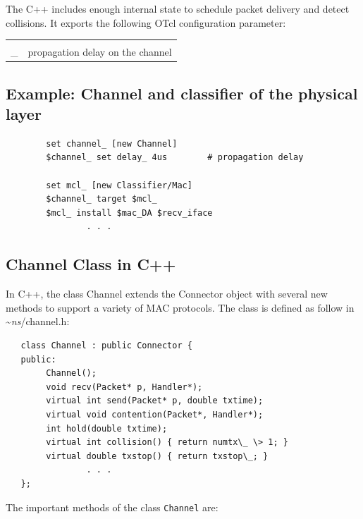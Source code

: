 The C++  includes enough internal
state to schedule packet delivery and detect collisions.  It exports the
following OTcl configuration parameter:

\begin{tabularx}{\linewidth}{rX}
{\tt delay\\_} & propagation delay on the channel \\
\end{tabularx}

\subsection{Example: Channel and classifier of the physical layer}
\label{ex:channel}

\begin{verbatim}
        set channel_ [new Channel]
        $channel_ set delay_ 4us        # propagation delay

        set mcl_ [new Classifier/Mac]
        $channel_ target $mcl_
        $mcl_ install $mac_DA $recv_iface
                . . .
\end{verbatim}

\subsection{Channel Class in C++}
\label{sec:channelcplus}

In C++, the class Channel extends the Connector object
with several new methods to
support a variety of MAC protocols.  The class is defined as follow in
\textasciitilde\emph{ns}/{channel.h}:

\begin{verbatim}
   class Channel : public Connector {
   public:
        Channel();
        void recv(Packet* p, Handler*);
        virtual int send(Packet* p, double txtime);
        virtual void contention(Packet*, Handler*);
        int hold(double txtime);
        virtual int collision() { return numtx\_ \> 1; }
        virtual double txstop() { return txstop\_; }
                . . .
   };
\end{verbatim}

The important methods of the class {\tt Channel} are:


